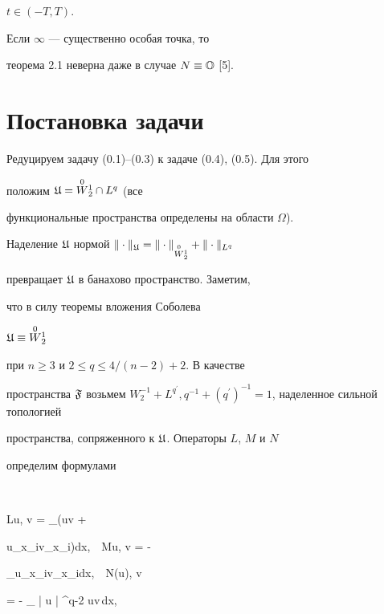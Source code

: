 $t \in (-T,T)$.





\begin{notes}


Если $\infty$ --- существенно особая точка, то


теорема 2.1 неверна даже в случае $N \equiv {\Bbb O}$ [5].


\end{notes}





\section{Постановка задачи}





Редуцируем задачу (0.1)--(0.3) к задаче (0.4), (0.5). Для этого


положим ${\frak U} = \overset{0}{W}{}_2^1 \cap L^q$ (все


функциональные пространства определены на области $\Omega$).


Наделение ${\frak U}$ нормой $\| \cdot \| _{\frak U}  =\linebreak


\| \cdot \|_{\overset{0}{W}{}_2^1} + \| \cdot \|_{L^q}$


превращает ${\frak U}$ в банахово пространство. Заметим,


что в силу теоремы вложения Соболева


${\frak U} \equiv \overset{0}{W}{}_2^1$


при $n \ge 3$ и $2 \le q \le 4/(n-2) + 2$. В качестве


пространства ${\frak F}$ возьмем $W_2^{-1} + L^{q^{\prime}},


q^{-1} + (q^{\prime})^{-1} = 1$, наделенное сильной топологией


пространства, сопряженного к ${\frak U}$. Операторы $L$, $M$ и $N$


определим формулами


$$


\langle Lu, v \rangle = \int_{\Omega }(uv + \varkappa


u_{x_{i}}v_{x_{i}})dx,\ \ \langle Mu, v \rangle = - \nu


\int_{\Omega }u_{x_{i}}v_{x_{i}}dx,\ \ \langle N(u), v


\rangle = - \int\limits_{\Omega } | u | ^{q-2} uv\,dx,


